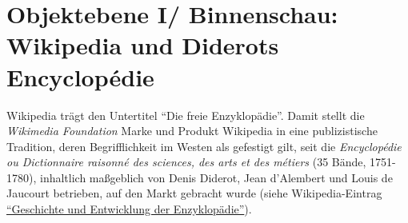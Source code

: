 \documentclass[fontsize=12pt]{scrartcl}
\begin{document}
\newpage

\section{Objektebene I/ Binnenschau: Wikipedia und Diderots \flq Encyclop\'{e}die\frq}
\label{sec:4}

Wi\-ki\-pe\-dia tr\"agt den Untertitel "`Die freie Enzy\-klop\"adie"'. Damit stellt die \textit{Wikimedia Foundation} Marke und Produkt Wi\-ki\-pe\-dia in eine publizistische Tradition, deren Begrifflichkeit im Westen als gefestigt gilt, seit die \textit{Encyclop\'{e}die ou Dictionnaire raisonn\'{e} des sciences, des arts et des m\'{e}tiers} (35 B\"ande, 1751-1780), inhaltlich ma{\ss}geblich von Denis Diderot, Jean d'Alembert und Louis de Jaucourt betrieben, auf den Markt gebracht wurde (siehe Wi\-ki\-pe\-dia-Eintrag \href{https://de.wikipedia.org/w/index.php?title=Geschichte_und_Entwicklung_der_Enzyklop\%C3\%A4die\&oldid=134462044}{"`Geschichte und Entwicklung der Enzyklop\"adie"'}).
\end{document}
